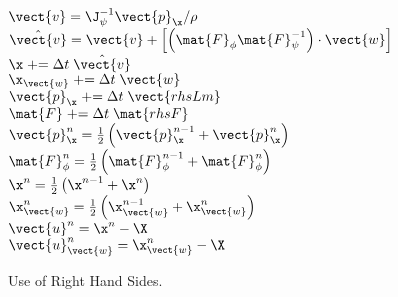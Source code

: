\begin{algorithm}[H]
	$\vect{v} = \J_{\psi}^{-1} \vect{p}_{\x}/\rho$ \\
	$\hat{\vect{v}} = \vect{v} + \left[ \left( \mat{F}_{\phi}\mat{F}_{\psi}^{-1}\right)\cdot\vect{w} \right]$ \\
	$\x \mathrel{{+}{=}} \Delta t \; \hat{\vect{v}}$ \\
	$\x_{\vect{w}} \mathrel{{+}{=}} \Delta t \; \vect{w}$ \\
	$\vect{p}_{\x} \mathrel{{+}{=}} \Delta t \; \vect{rhsLm}$ \\
	$\mat{F} \mathrel{{+}{=}} \Delta t \; \mat{rhsF}$ \\
	$\vect{p}_{\x}^n = \frac{1}{2}\left( \vect{p}_{\x}^{n-1} + \vect{p}_{\x}^n \right)$ \\
	$\mat{F}_{\phi}^n = \frac{1}{2}\left( \mat{F}_{\phi}^{n-1} + \mat{F}_{\phi}^n \right)$ \\
	$\x^n = \frac{1}{2}\left( \x^{n-1} + \x^n \right)$ \\
	$\x_{\vect{w}}^n = \frac{1}{2}\left( \x_{\vect{w}}^{n-1} + \x_{\vect{w}}^n \right)$ \\
	$\vect{u}^{n} = \x^n - \X$ \\
	$\vect{u}_{\vect{w}}^{n} = \x_{\vect{w}}^n - \X$
	\caption{Use of Right Hand Sides.}
\end{algorithm}

\bigbreak

%
%
%
